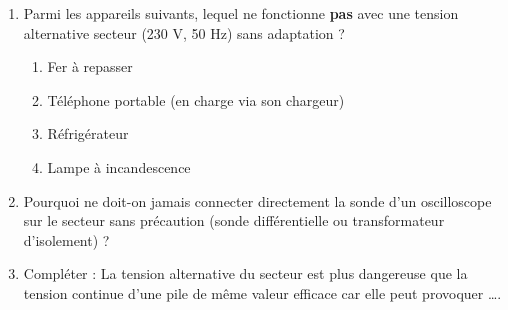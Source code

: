 \documentclass[11pt]{article}
\begin{document}
\begin{exercice}
\begin{enumerate}
    \item Parmi les appareils suivants, lequel ne fonctionne \textbf{pas} avec une tension alternative secteur (230 V, 50 Hz) sans adaptation ?
    \begin{enumerate}
        \item Fer à repasser
        \item Téléphone portable (en charge via son chargeur)
        \item Réfrigérateur
        \item Lampe à incandescence
    \end{enumerate}
    \item Pourquoi ne doit-on jamais connecter directement la sonde d'un oscilloscope sur le secteur sans précaution (sonde différentielle ou transformateur d'isolement) ?
    \item Compléter : La tension alternative du secteur est plus dangereuse que la tension continue d'une pile de même valeur efficace car elle peut provoquer \ldots{}.
\end{enumerate}
\end{exercice}
\end{document}
